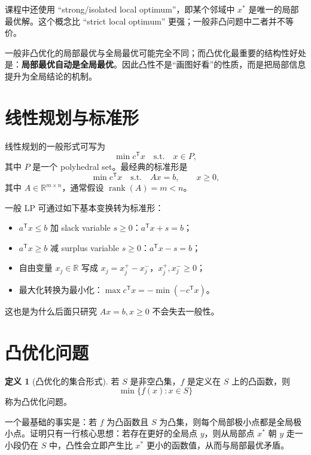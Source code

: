 \documentclass[11pt,a4paper,openany]{ctexrep}
\theoremstyle{definition}
\newtheorem{definition}[theorem]{定义}
\newcommand{\R}{\mathbb{R}}
\newcommand{\rank}{\operatorname{rank}}
\newcommand{\transpose}{\mathsf{T}}
\begin{document}
课程中还使用 ``strong/isolated local optimum''，即某个邻域中 $x^*$ 是唯一的局部最优解。这个概念比 ``strict local optimum'' 更强；一般非凸问题中二者并不等价。

\begin{keybox}[为什么要尽快进入凸优化？]
一般非凸优化的局部最优与全局最优可能完全不同；而凸优化最重要的结构性好处是：\textbf{局部最优自动是全局最优}。因此凸性不是“画图好看”的性质，而是把局部信息提升为全局结论的机制。\cite[Ch.~1--4]{boyd}
\end{keybox}

\section{线性规划与标准形}
线性规划的一般形式可写为
\[
\min c^\transpose x\quad\text{s.t.}\quad x\in P,
\]
其中 $P$ 是一个 polyhedral set。最经典的标准形是
\begin{equation}
\min c^\transpose x\quad\text{s.t.}\quad Ax=b,\qquad x\ge 0,
\label{eq:lp-standard}
\end{equation}
其中 $A\in\R^{m\times n}$，通常假设 $\rank(A)=m<n$。

一般 LP 可通过如下基本变换转为标准形：
\begin{itemize}[leftmargin=2em]
  \item $a^\transpose x\le b$ 加 slack variable $s\ge0$：$a^\transpose x+s=b$；
  \item $a^\transpose x\ge b$ 减 surplus variable $s\ge0$：$a^\transpose x-s=b$；
  \item 自由变量 $x_j\in\R$ 写成 $x_j=x_j^+-x_j^-$，$x_j^+,x_j^-\ge0$；
  \item 最大化转换为最小化：$\max c^\transpose x=-\min(-c^\transpose x)$。
\end{itemize}
这也是为什么后面只研究 $Ax=b,x\ge0$ 不会失去一般性。\cite[Ch.~1--2]{bertsimas}\cite[Ch.~2]{luenberger}

\section{凸优化问题}
\begin{definition}[凸优化的集合形式]
若 $S$ 是非空凸集，$f$ 是定义在 $S$ 上的凸函数，则
\[
\min\{f(x):x\in S\}
\]
称为凸优化问题。
\end{definition}

一个最基础的事实是：若 $f$ 为凸函数且 $S$ 为凸集，则每个局部极小点都是全局极小点。证明只有一行核心思想：若存在更好的全局点 $y$，则从局部点 $x^*$ 朝 $y$ 走一小段仍在 $S$ 中，凸性会立即产生比 $x^*$ 更小的函数值，从而与局部最优矛盾。
\end{document}
